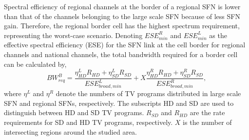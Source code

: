 \documentclass[journal]{IEEEtran}
\begin{document}
Spectral efficiency of regional channels at the border of a regional SFN is lower than that of the channels belonging to the large scale SFN because of less SFN gain. Therefore, the regional border cell has the highest spectrum requirement, representing the worst-case scenario. Denoting $ESE_{min}^R$ and $ESE_{min}^L$ as the effective spectral efficiency (ESE) for the SFN link at the cell border for regional channels and national channels, the total bandwidth required for a border cell can be calculated by,	
\begin{equation}\label{BW_broad}
  BW_{req}^B=\frac{\eta_{HD}^L R_{HD}+\eta_{SD}^L R_{SD}}{ESE_{broad,min}^L}+X\frac{\eta_{HD}^R R_{HD}+\eta_{SD}^R R_{SD}}{ESE_{broad,min}^R },
\end{equation}
where $\eta^L$ and $\eta^R$ denote the numbers of TV programs distributed in large scale SFN and regional SFNs, respectively. The subscripts HD and SD are used to distinguish between HD and SD TV programs. $R_{SD}$ and $R_{HD}$ are the rate requirements for SD and HD TV programs, respectively. $X$ is the number of intersecting regions around the studied area.
\end{document}
